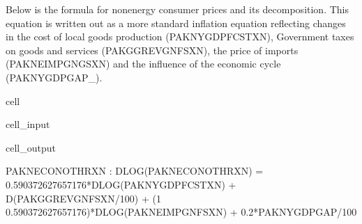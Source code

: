 \documentclass[letterpaper,10pt,english]{jupyterBook}
\begin{document}
\sphinxAtStartPar
Below is the formula for nonenergy consumer prices and its decomposition. This equation is written out as a more standard inflation equation reflecting changes in the cost of local goods production (PAKNYGDPFCSTXN), Government taxes on goods and services (PAKGGREVGNFSXN), the price of imports (PAKNEIMPGNGSXN) and the influence of the economic cycle (PAKNYGDPGAP\_).

\begin{sphinxuseclass}{cell}\begin{sphinxVerbatimInput}

\begin{sphinxuseclass}{cell_input}
\begin{sphinxVerbatim}[commandchars=\\\{\}]
\PYG{p}{[}\PYG{p}{]}
\end{sphinxVerbatim}

\end{sphinxuseclass}\end{sphinxVerbatimInput}
\begin{sphinxVerbatimOutput}

\begin{sphinxuseclass}{cell_output}
\begin{sphinxVerbatim}[commandchars=\\\{\}]
PAKNECONOTHRXN : DLOG(PAKNECONOTHRXN) = 0.590372627657176*DLOG(PAKNYGDPFCSTXN) + D(PAKGGREVGNFSXN/100) + (1 \PYGZhy{} 0.590372627657176)*DLOG(PAKNEIMPGNFSXN) + 0.2*PAKNYGDPGAP\PYGZus{}/100
\end{sphinxVerbatim}

\end{sphinxuseclass}\end{sphinxVerbatimOutput}

\end{sphinxuseclass}
\end{document}
